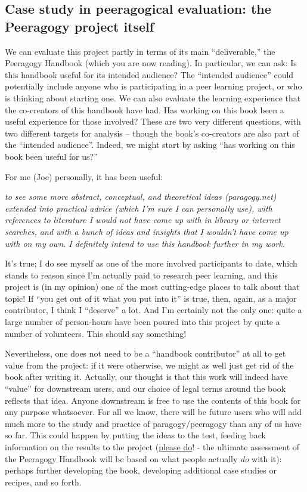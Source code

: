 \subsection{Case study in peeragogical evaluation: the Peeragogy project
itself}

We can evaluate this project partly in terms of its main
``deliverable,'' the Peeragogy Handbook (which you are now reading). In
particular, we can ask: Is this handbook useful for its intended
audience? The ``intended audience'' could potentially include anyone who
is participating in a peer learning project, or who is thinking about
starting one. We can also evaluate the learning experience that the
co-creators of this handbook have had. Has working on this book been a
useful experience for those involved? These are two very different
questions, with two different targets for analysis -- though the book's
co-creators are also part of the ``intended audience''. Indeed, we might
start by asking ``has working on this book been useful for us?''

For me (Joe) personally, it has been useful:

\emph{to see some more abstract, conceptual, and theoretical ideas
(paragogy.net) extended into practical advice (which I'm sure I can
personally use), with references to literature I would not have come up
with in library or internet searches, and with a bunch of ideas and
insights that I wouldn't have come up with on my own. I definitely
intend to use this handbook further in my work.}

It's true; I do see myself as one of the more involved participants to
date, which stands to reason since I'm actually paid to research peer
learning, and this project is (in my opinion) one of the most
cutting-edge places to talk about that topic! If ``you get out of it
what you put into it'' is true, then, again, as a major contributor, I
think I ``deserve'' a lot. And I'm certainly not the only one: quite a
large number of person-hours have been poured into this project by quite
a number of volunteers. This should say something!

Nevertheless, one does not need to be a ``handbook contributor'' at all
to get value from the project: if it were otherwise, we might as well
just get rid of the book after writing it. Actually, our thought is that
this work will indeed have ``value'' for downstream users, and our
choice of legal terms around the book reflects that idea. Anyone
downstream is free to use the contents of this book for any purpose
whatsoever. For all we know, there will be future users who will add
much more to the study and practice of paragogy/peeragogy than any of us
have so far. This could happen by putting the ideas to the test, feeding
back information on the results to the project
(\href{http://peeragogy.org/contact/}{please do}! - the ultimate
assessment of the Peeragogy Handbook will be based on what people
actually \emph{do} with it): perhaps further developing the book,
developing additional case studies or recipes, and so forth.

